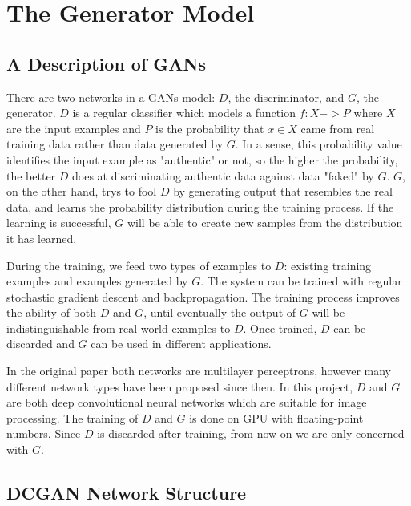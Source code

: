 
\chapter{The Generator Model}

\section{A Description of GANs}

There are two networks in a GANs model: $D$, the discriminator, and $G$, the generator. $D$ is a regular
classifier which models a function $f: X -> P$ where $X$ are the input examples and $P$ is the probability
that $x \in X$ came from real training data rather than data generated by $G$. In a sense, this probability
value identifies the input example as "authentic" or not, so the higher the probability, the better $D$ does
at discriminating authentic data against data "faked" by $G$. $G$, on the other hand, trys to fool $D$ by
generating output that resembles the real data, and learns the probability distribution during the training
process. If the learning is successful, $G$ will be able to create new samples from the distribution it
has learned.


During the training, we feed two types of examples to $D$: existing training examples and examples generated
by $G$. The system can be trained with regular stochastic gradient descent and backpropagation. The training
process improves the ability of both $D$ and $G$, until eventually the output of $G$ will be
indistinguishable from real world examples to $D$. Once trained, $D$ can be discarded and $G$ can be used
in different applications.

In the original paper both networks are multilayer perceptrons, however many different network types have been
proposed since then. In this project, $D$ and $G$ are both deep convolutional neural networks which are
suitable for image processing. The training of $D$ and $G$ is done on GPU with floating-point numbers. Since
$D$ is discarded after training, from now on we are only concerned with $G$.

\section{DCGAN Network Structure}

